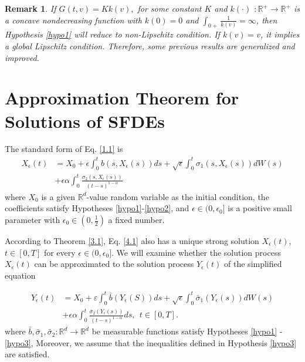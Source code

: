 \documentclass[a4 paper, 12pt]{report}
\theoremstyle{plain}
\newtheorem{remark}[theorem]{\textbf{Remark}}
\begin{document}
\begin{remark}\label{r3.1}
\normalfont
If $G(t, v) = Kk(v),$ for some constant $K$ and $k(\cdot)$ $: \mathbb{R}^+ \rightarrow\mathbb{R}^+$ is a
concave nondecreasing function with $k(0) = 0$ and $\int_{0+}\frac{1}{k(v)} = \infty$, then Hypothesis \ref{hypo1} will reduce to non-Lipschitz condition. If $k(v) = v$, it implies a global Lipschitz condition. Therefore, some previous results are generalized and improved.
\end{remark}

\section{Approximation Theorem for Solutions of SFDEs}
\noindent
\par The standard form of Eq. \eqref{1.1} is 
\begin{equation}\label{4.1}
\begin{split}
X_\epsilon(t)& = X_0+\epsilon\int_0^tb(s,X_\epsilon(s))ds+\sqrt{\epsilon}\int_0^t\sigma_1(s,X_\epsilon(s))dW(s)\\
&+\epsilon\alpha\int_0^t\frac{\sigma_2(s,X_\epsilon(s))}{(t-s)^{1-\alpha}}
\end{split}
\end{equation}
where $X_0$ is a given $\mathbb{R}^d$-value random variable as the initial condition, the coefficients
satisfy Hypotheses \ref{hypo1}-\ref{hypo2}, and $\epsilon\in(0,\epsilon_0]$ is a positive small parameter with $\epsilon_0\in(0,\frac{1}{2})$ 
a fixed number.\\
\par According to Theorem \ref{3.1}, Eq. \eqref{4.1} also has a unique strong solution $X_\epsilon(t)$,
$t \in [0,T]$ for every $\epsilon\in (0, \epsilon_0]$. We will examine whether the solution process $X_\epsilon(t)$ can be approximated to the solution process $Y_\epsilon(t)$ of the simplified equation

\begin{equation}\label{4.2}
\begin{split}
Y_\epsilon(t)& = X_0 +\varepsilon\int_0^t\bar{b}(Y_\epsilon(S))ds +\sqrt{\epsilon}\int_0^t\bar{\sigma}_1(Y_\epsilon(s))dW(s)\\
&+\epsilon\alpha\int_0^t \frac{\bar{\sigma}_2(Y_\epsilon(s))}{(t-s)^{1-\alpha}}ds,~~t\in[0,T].
\end{split}
\end{equation}
where $\bar{b},\bar{\sigma}_1,\bar{\sigma}_2:\mathbb{R}^d\rightarrow\mathbb{R}^d$ be measurable functions satisfy Hypotheses \ref{hypo1} - \ref{hypo3}, Moreover, we assume that the inequalities defined in Hypothesis \ref{hypo3} are satisfied. 
\end{document}
